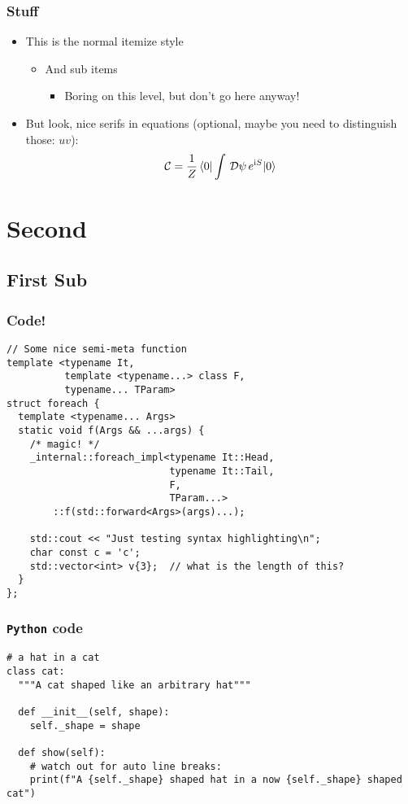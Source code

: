 \documentclass[mathserif, fleqn]{beamer}
\begin{document}
\begin{frame}\frametitle{Stuff}
  \begin{itemize}
  \item This is the normal itemize style
    \begin{itemize}
    \item And sub items
      \begin{itemize}
      \item Boring on this level, but don't go here anyway!
      \end{itemize}
    \end{itemize}

  \item But look, nice serifs in equations (optional, maybe you need to distinguish those: $uv$):
    \begin{align*}
      \mathcal{C} = \frac1{Z} \braket{0|\int\,\mathcal{D}\psi\,e^{\mathrm{i} S}|0}
    \end{align*}
  \end{itemize}
\end{frame}

\section{Second}
\subsection{First Sub}
\begin{frame}[fragile]\frametitle{Code!}
  \begin{lstlisting}[caption={A test C++ listing}]
// Some nice semi-meta function
template <typename It,
          template <typename...> class F,
          typename... TParam>
struct foreach {
  template <typename... Args>
  static void f(Args && ...args) {
    /* magic! */
    _internal::foreach_impl<typename It::Head,
                            typename It::Tail,
                            F,
                            TParam...>
        ::f(std::forward<Args>(args)...);

    std::cout << "Just testing syntax highlighting\n";
    char const c = 'c';
    std::vector<int> v{3};  // what is the length of this?
  }
};
  \end{lstlisting}
\end{frame}

\begin{frame}[fragile]\frametitle{\texttt{Python} code}
  \lstset{language=python}
  \begin{lstlisting}[caption={Some Python as well}]
# a hat in a cat
class cat:
  """A cat shaped like an arbitrary hat"""

  def __init__(self, shape):
    self._shape = shape

  def show(self):
    # watch out for auto line breaks:
    print(f"A {self._shape} shaped hat in a now {self._shape} shaped cat")
  \end{lstlisting}
\end{frame}
\end{document}
